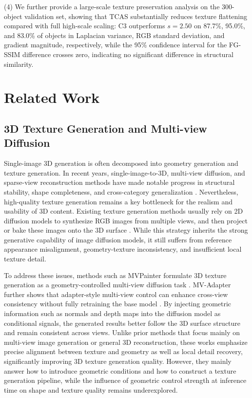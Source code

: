 \documentclass[times,twocolumn,final]{elsarticle}
\begin{document}
(4) We further provide a large-scale texture preservation analysis on the 300-object validation set, showing that TCAS substantially reduces texture flattening compared with full high-scale scaling: C3 outperforms $s = 2.50$ on 87.7\%, 95.0\%, and 83.0\% of objects in Laplacian variance, RGB standard deviation, and gradient magnitude, respectively, while the 95\% confidence interval for the FG-SSIM difference crosses zero, indicating no significant difference in structural similarity.

\section{Related Work}
\label{sec:related}

\subsection{3D Texture Generation and Multi-view Diffusion}
\label{subsec:3dtex}

Single-image 3D generation is often decomposed into geometry generation and texture generation. In recent years, single-image-to-3D, multi-view diffusion, and sparse-view reconstruction methods have made notable progress in structural stability, shape completeness, and cross-category generalization \cite{liu2023zero1to3,shi2023zero123pp,liu2023syncdreamer,long2023wonder3d,shi2024mvdream,wang2023imagedream,xu2024instantmesh,ke2024era3d}. Nevertheless, high-quality texture generation remains a key bottleneck for the realism and usability of 3D content. Existing texture generation methods usually rely on 2D diffusion models to synthesize RGB images from multiple views, and then project or bake these images onto the 3D surface \cite{chen2023text2tex,richardson2023texture,poole2023dreamfusion,chen2023fantasia3d}. While this strategy inherits the strong generative capability of image diffusion models, it still suffers from reference appearance misalignment, geometry-texture inconsistency, and insufficient local texture detail.

To address these issues, methods such as MVPainter formulate 3D texture generation as a geometry-controlled multi-view diffusion task \cite{shao2025mvpainter}. MV-Adapter further shows that adapter-style multi-view control can enhance cross-view consistency without fully retraining the base model \cite{huang2024mvadapter}. By injecting geometric information such as normals and depth maps into the diffusion model as conditional signals, the generated results better follow the 3D surface structure and remain consistent across views. Unlike prior methods that focus mainly on multi-view image generation or general 3D reconstruction, these works emphasize precise alignment between texture and geometry as well as local detail recovery, significantly improving 3D texture generation quality. However, they mainly answer how to introduce geometric conditions and how to construct a texture generation pipeline, while the influence of geometric control strength at inference time on shape and texture quality remains underexplored.
\end{document}
